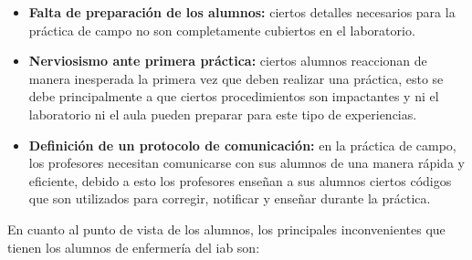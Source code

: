 \begin{itemize}

    \item \textbf{Falta de preparación de los alumnos:} ciertos detalles
        necesarios para la práctica de campo no son completamente cubiertos en
        el laboratorio.

    \item \textbf{Nerviosismo ante primera práctica:} ciertos alumnos reaccionan
        de manera inesperada la primera vez que deben realizar una práctica,
        esto se debe principalmente a que ciertos procedimientos son impactantes
        y ni el laboratorio ni el aula pueden preparar para este tipo de
        experiencias.
                
    \item \textbf{Definición de un protocolo de comunicación:} en la práctica de
        campo, los profesores necesitan comunicarse con sus alumnos de una
        manera rápida y eficiente, debido a esto los profesores enseñan a sus
        alumnos ciertos códigos que son utilizados para corregir, notificar y
        enseñar durante la práctica.
          
\end{itemize}


En cuanto al punto de vista de los alumnos, los principales inconvenientes que
tienen los alumnos de enfermería del \Gls{iab} son:

